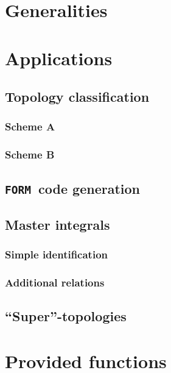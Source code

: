 \documentclass{article}
\newcommand{\FORM}[0]{{\tt FORM}\ }
\begin{document}
\section{Generalities}

\section{Applications}


\subsection{Topology classification}

\subsubsection{Scheme A}

\subsubsection{Scheme B}

\subsection{\FORM code generation}

\subsection{Master integrals}

\subsubsection{Simple identification}

\subsubsection{Additional relations}

\subsection{``Super''-topologies}

\section{Provided functions}
\end{document}
